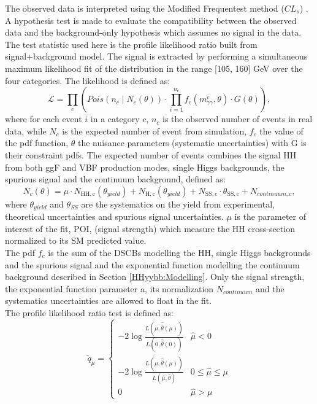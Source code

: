 The observed data is interpreted using the Modified Frequentest method ($CL_s$) \cite{CL_s}. A hypothesis test is made to evaluate the compatibility between the observed data and the background-only hypothesis which assumes no signal in the data. The test statistic used here is the profile likelihood ratio \cite{Z} built from signal+background model. The signal is extracted by performing a simultaneous maximum likelihood fit of the \myy distribution in the range [105, 160] GeV over the four categories. The likelihood is defined as: 
\begin{equation}
    \mathcal{L}=\prod_{c}\left(Pois\left(n_{c}
    \mid N_{c}(\theta)\right) \cdot \prod_{i=1}^{n_{c}}
    f_{c}\left(m_{\gamma \gamma}^{i}, \theta\right) \cdot G(\theta)\right),
\end{equation}
where for each event $i$ in a category $c$, $n_c$ is the observed number of events in real data, while $N_c$ is the expected number of event from simulation, 
$f_c$ the value of the pdf function, $\theta$ the nuisance parameters (systematic uncertainties) with G is their constraint pdfs. 
The expected number of events combines the signal HH from both ggF and VBF production modes, single Higgs backgrounds, the spurious signal and the continuum background, defined as: 
\begin{equation}
    N_{c}(\theta)=\mu \cdot N_{\mathrm{HH},
    \mathrm{c}}\left(\theta_{yield }\right)+N_{\mathrm{H},
    \mathrm{c}}\left(\theta_{yield }\right)+N_{\mathrm{SS},
    \mathrm{c}} \cdot \theta_{\mathrm{SS},
    \mathrm{c}}+N_{continuum , \mathrm{c}},
\end{equation}
where $\theta_{yield}$ and $\theta_{SS}$ are the systematics on the yield from experimental, theoretical uncertainties and spurious signal uncertainties. $\mu$ is the parameter of interest of the fit, POI, (signal strength) which measure the HH cross-section normalized to its SM predicted value. \\
The pdf $f_c$ is the sum of the DSCBs modelling the HH, single Higgs backgrounds and the spurious signal and the exponential function modelling the continuum background described in Section \ref{HHyybb:Modelling}. Only the signal strength, the exponential function parameter a, its normalization $N_{continuum}$ and the systematics uncertainties are allowed to float in the fit. \\
The profile likelihood ratio test is defined as: 
\begin{equation}
    \tilde{q}_{\mu}=\left\{\begin{array}{ll}
-2 \log \frac{L(\mu, \hat{\hat{\theta}}({\mu}))}{L(0, \hat{\hat{\theta}}(0))} & \hat{\mu}<0 \\
-2 \log \frac{L(\mu, \hat{\hat{\theta}}({\mu}))}{L(\hat{\mu}, \hat{\theta})} & 0 \leq \hat{\mu} \leq \mu \\
0 & \hat{\mu}>\mu
\end{array}\right.
\end{equation}
